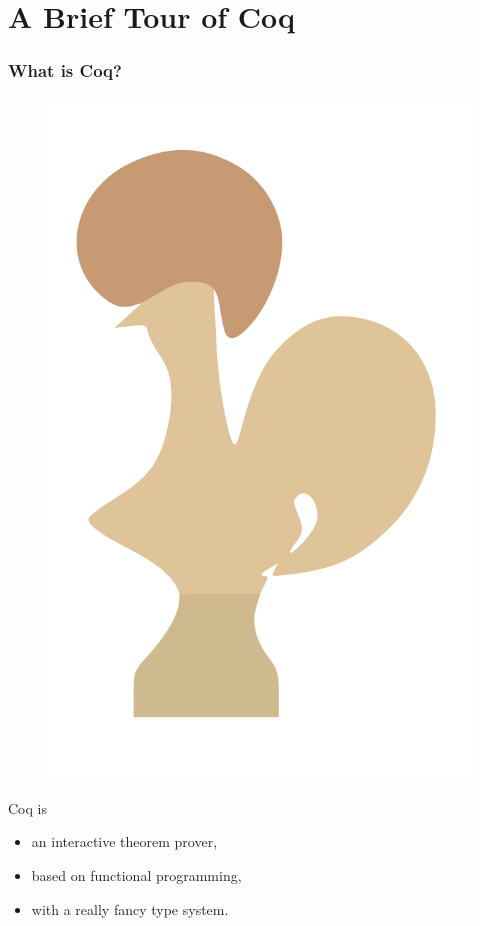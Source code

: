 \documentclass{beamer}
\begin{document}
\section{A Brief Tour of Coq}

\begin{frame}
  \frametitle{What is Coq?}

  \begin{figure}
    \includegraphics[height=0.4\textheight]{coq}
  \end{figure}

  Coq is
  \begin{itemize}
  \item an interactive theorem prover,
  \item based on functional programming,
  \item with a really fancy type system.
  \end{itemize}
\end{frame}
\end{document}
